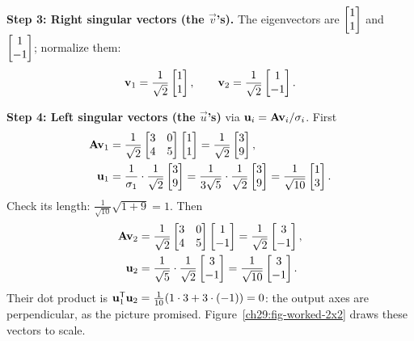 \textbf{Step 3: Right singular vectors (the $\vec{v}$'s).} The eigenvectors are
$\begin{bmatrix}1\\1\end{bmatrix}$ and $\begin{bmatrix}1\\-1\end{bmatrix}$; normalize them:
\[
  \mathbf{v}_1 = \frac{1}{\sqrt2}\begin{bmatrix}1\\1\end{bmatrix}, \qquad
  \mathbf{v}_2 = \frac{1}{\sqrt2}\begin{bmatrix}1\\-1\end{bmatrix}.
\]

\textbf{Step 4: Left singular vectors (the $\vec{u}$'s)} via $\mathbf{u}_i =
\mathbf{A}\mathbf{v}_i / \sigma_i$. First
\begin{align*}
  \mathbf{A}\mathbf{v}_1 &= \frac{1}{\sqrt2}\begin{bmatrix} 3 & 0 \\ 4 & 5 \end{bmatrix}\begin{bmatrix}1\\1\end{bmatrix}
  = \frac{1}{\sqrt2}\begin{bmatrix}3\\9\end{bmatrix}, \\
  \mathbf{u}_1 &= \frac{1}{\sigma_1}\cdot\frac{1}{\sqrt2}\begin{bmatrix}3\\9\end{bmatrix}
  = \frac{1}{3\sqrt5}\cdot\frac{1}{\sqrt2}\begin{bmatrix}3\\9\end{bmatrix}
  = \frac{1}{\sqrt{10}}\begin{bmatrix}1\\3\end{bmatrix}.
\end{align*}
Check its length: $\frac{1}{\sqrt{10}}\sqrt{1+9} = 1$. Then
\begin{align*}
  \mathbf{A}\mathbf{v}_2 &= \frac{1}{\sqrt2}\begin{bmatrix} 3 & 0 \\ 4 & 5 \end{bmatrix}\begin{bmatrix}1\\-1\end{bmatrix}
  = \frac{1}{\sqrt2}\begin{bmatrix}3\\-1\end{bmatrix}, \\
  \mathbf{u}_2 &= \frac{1}{\sqrt5}\cdot\frac{1}{\sqrt2}\begin{bmatrix}3\\-1\end{bmatrix}
  = \frac{1}{\sqrt{10}}\begin{bmatrix}3\\-1\end{bmatrix}.
\end{align*}
Their dot product is $\mathbf{u}_1^{\mathsf{T}}\mathbf{u}_2 = \frac{1}{10}(1\cdot 3 + 3\cdot(-1)) = 0$: the
output axes are perpendicular, as the picture promised.
Figure~\ref{ch29:fig-worked-2x2} draws these vectors to scale.

